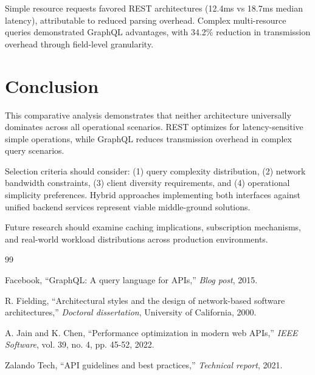 \documentclass[10pt,twocolumn,letterpaper]{IEEEtran}
\begin{document}
Simple resource requests favored REST architectures (12.4ms vs 18.7ms median latency), attributable to reduced parsing overhead. Complex multi-resource queries demonstrated GraphQL advantages, with 34.2\% reduction in transmission overhead through field-level granularity.

\section{Conclusion}

This comparative analysis demonstrates that neither architecture universally dominates across all operational scenarios. REST optimizes for latency-sensitive simple operations, while GraphQL reduces transmission overhead in complex query scenarios.

Selection criteria should consider: (1) query complexity distribution, (2) network bandwidth constraints, (3) client diversity requirements, and (4) operational simplicity preferences. Hybrid approaches implementing both interfaces against unified backend services represent viable middle-ground solutions.

Future research should examine caching implications, subscription mechanisms, and real-world workload distributions across production environments.

\begin{thebibliography}{99}

 Facebook, ``GraphQL: A query language for APIs,'' \textit{Blog post}, 2015.

 R. Fielding, ``Architectural styles and the design of network-based software architectures,'' \textit{Doctoral dissertation}, University of California, 2000.

 A. Jain and K. Chen, ``Performance optimization in modern web APIs,'' \textit{IEEE Software}, vol. 39, no. 4, pp. 45-52, 2022.

 Zalando Tech, ``API guidelines and best practices,'' \textit{Technical report}, 2021.

\end{thebibliography}
\end{document}
